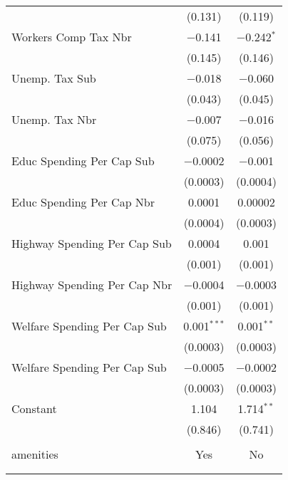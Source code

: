 \begin{table}[!htbp]
\begin{tabular}{@{\extracolsep{5pt}}lcc}
  & (0.131) & (0.119) \\ 
  Workers Comp Tax Nbr & $-$0.141 & $-$0.242$^{*}$ \\ 
  & (0.145) & (0.146) \\ 
  Unemp. Tax Sub & $-$0.018 & $-$0.060 \\ 
  & (0.043) & (0.045) \\ 
  Unemp. Tax Nbr & $-$0.007 & $-$0.016 \\ 
  & (0.075) & (0.056) \\ 
  Educ Spending Per Cap Sub & $-$0.0002 & $-$0.001 \\ 
  & (0.0003) & (0.0004) \\ 
  Educ Spending Per Cap Nbr & 0.0001 & 0.00002 \\ 
  & (0.0004) & (0.0003) \\ 
  Highway Spending Per Cap Sub & 0.0004 & 0.001 \\ 
  & (0.001) & (0.001) \\ 
  Highway Spending Per Cap Nbr & $-$0.0004 & $-$0.0003 \\ 
  & (0.001) & (0.001) \\ 
  Welfare Spending Per Cap Sub & 0.001$^{***}$ & 0.001$^{**}$ \\ 
  & (0.0003) & (0.0003) \\ 
  Welfare Spending Per Cap Sub & $-$0.0005 & $-$0.0002 \\ 
  & (0.0003) & (0.0003) \\ 
  Constant & 1.104 & 1.714$^{**}$ \\ 
  & (0.846) & (0.741) \\ 
 \hline \\[-1.8ex] 
amenities & Yes & No \\ 
\hline \\[-1.8ex] 
\hline 
\hline \\[-1.8ex] 
\end{tabular} 
\end{table} 
